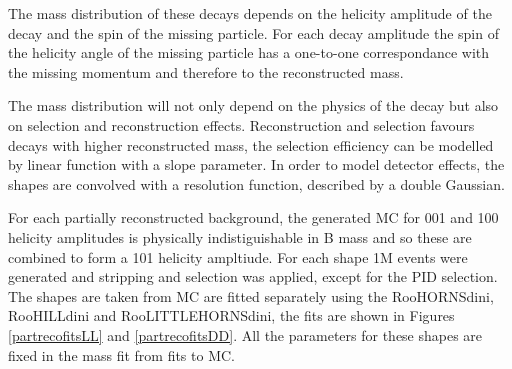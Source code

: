 The \B mass distribution of these decays depends on the helicity amplitude of the decay and the spin of the missing particle. For each decay amplitude the spin of the helicity angle of the missing particle has a one-to-one correspondance with the missing momentum and therefore to the reconstructed \B mass. 

The \B mass distribution will not only depend on the physics of the decay but also on selection and reconstruction effects. Reconstruction and selection favours decays with higher reconstructed \B mass, the selection efficiency can be modelled by linear function with a slope parameter. In order to model detector effects, the shapes are convolved with a resolution function, described by a double Gaussian.

For each partially reconstructed background, the generated MC for 001 and 100 helicity amplitudes is physically indistiguishable in B mass and so these are combined to form a 101 helicity ampltiude. For each shape 1M events were generated and stripping and selection was applied, except for the PID selection. The shapes are taken from MC are fitted separately using the RooHORNSdini, RooHILLdini and RooLITTLEHORNSdini, the fits are shown in Figures \ref{partrecofitsLL} and \ref{partrecofitsDD}. All the parameters for these shapes are fixed in the mass fit from fits to MC.

